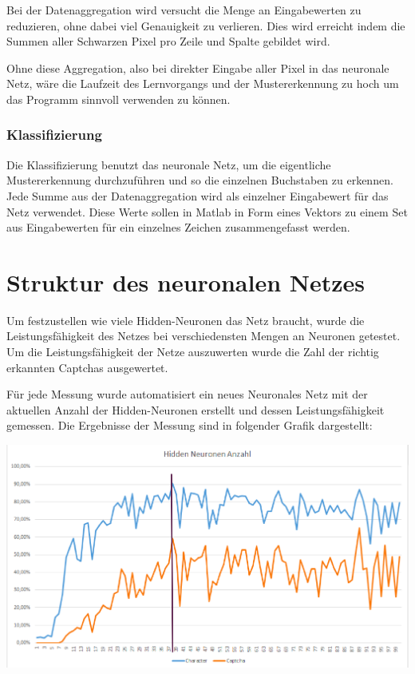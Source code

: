 Bei der Datenaggregation wird versucht die Menge an Eingabewerten zu reduzieren,
ohne dabei viel Genauigkeit zu verlieren. Dies wird erreicht indem 
die Summen aller Schwarzen Pixel pro Zeile und Spalte gebildet wird. 

Ohne diese Aggregation, also bei direkter Eingabe aller Pixel in das
neuronale Netz, wäre die Laufzeit des Lernvorgangs und der Mustererkennung zu
hoch um das Programm sinnvoll verwenden zu können.
\subsubsection{Klassifizierung}

Die Klassifizierung benutzt das neuronale Netz, um die eigentliche
Mustererkennung durchzuführen und so die einzelnen Buchstaben zu
erkennen. Jede Summe aus der Datenaggregation wird als einzelner Eingabewert
für das Netz verwendet. Diese Werte sollen in Matlab in Form eines Vektors zu
einem Set aus Eingabewerten für ein einzelnes Zeichen zusammengefasst werden.

\section{Struktur des neuronalen Netzes}

Um festzustellen wie viele Hidden-Neuronen das Netz braucht, wurde die
Leistungsfähigkeit des Netzes bei verschiedensten Mengen an Neuronen getestet.
Um die Leistungsfähigkeit der Netze auszuwerten wurde die Zahl der richtig
erkannten Captchas ausgewertet. 

Für jede Messung wurde automatisiert ein neues Neuronales Netz mit der aktuellen
Anzahl der Hidden-Neuronen erstellt und dessen Leistungsfähigkeit gemessen.
Die Ergebnisse der Messung sind in folgender Grafik dargestellt:

\includegraphics[width=14cm]{res/performance.png}

